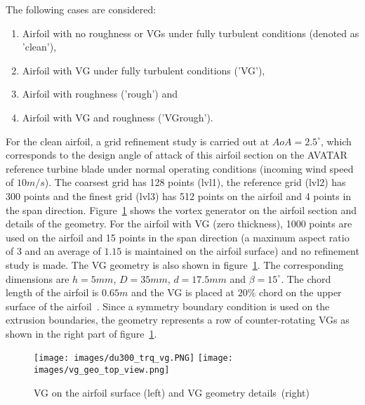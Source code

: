 The following cases are considered:
\begin{enumerate}
    \item Airfoil with no roughness or VGs under fully turbulent conditions (denoted as 'clean'),
    \item Airfoil with VG under fully turbulent conditions ('VG'),
    \item Airfoil with roughness ('rough') and
    \item Airfoil with VG and roughness ('VGrough').
\end{enumerate} 

For the clean airfoil, a grid refinement study is carried out at $AoA=2.5^{\circ}$, which corresponds to the design angle of attack of this airfoil section on the AVATAR reference turbine blade under normal operating conditions (incoming wind speed of $10m/s$). The coarsest grid has 128 points (lvl1), the reference grid (lvl2) has 300 points and the finest grid (lvl3) has 512 points on the airfoil and 4 points in the span direction. Figure~\ref{fig:geo_vg_mesh} shows the vortex generator on the airfoil section and details of the geometry. For the airfoil with VG (zero thickness), 1000 points are used on the airfoil and 15 points in the span direction (a maximum aspect ratio of $3$ and an average of $1.15$ is maintained on the airfoil surface) and no refinement study is made. The VG geometry is also shown in figure~\ref{fig:geo_vg_mesh}. The corresponding dimensions are $h=5mm$, $D=35mm$, $d=17.5mm$ and $\beta = 15^{\circ}$. The chord length of the airfoil is $0.65m$ and the VG is placed at $20\%$ chord on the upper surface of the airfoil~\cite{baldacchino2018experimental}. Since a symmetry boundary condition is used on the extrusion boundaries, the geometry represents a row of counter-rotating VGs as shown in the right part of figure~\ref{fig:geo_vg_mesh}.
\begin{figure}[h]
    \centering
    \captionsetup{justification=centering}
    \texttt{[image: images/du300\_trq\_vg.PNG]}
    \texttt{[image: images/vg\_geo\_top\_view.png]} 
    \vspace*{-0.2cm}
    \caption{VG on the airfoil surface (left) and VG geometry details~\cite{baldacchino2018experimental}(right)}
   \label{fig:geo_vg_mesh}
\end{figure}

